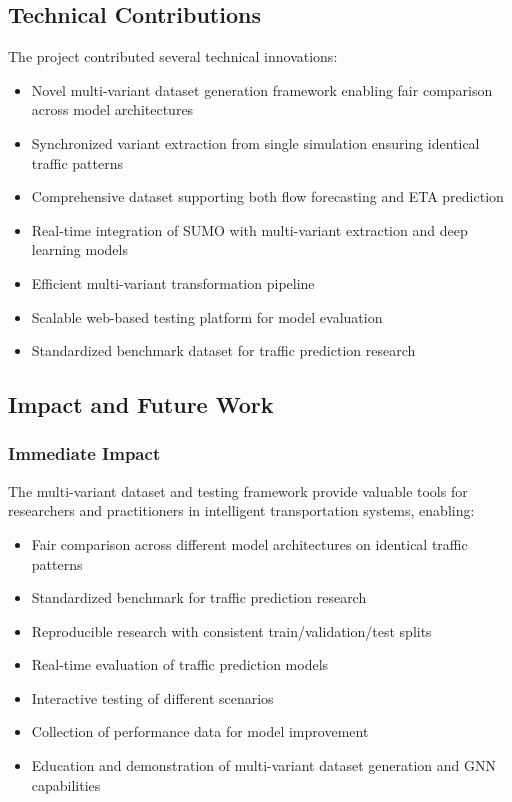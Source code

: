 \subsection{Technical Contributions}

The project contributed several technical innovations:
\begin{itemize}
    \item Novel multi-variant dataset generation framework enabling fair comparison across model architectures
    \item Synchronized variant extraction from single simulation ensuring identical traffic patterns
    \item Comprehensive dataset supporting both flow forecasting and ETA prediction
    \item Real-time integration of SUMO with multi-variant extraction and deep learning models
    \item Efficient multi-variant transformation pipeline
    \item Scalable web-based testing platform for model evaluation
    \item Standardized benchmark dataset for traffic prediction research
\end{itemize}

\subsection{Impact and Future Work}

\subsubsection{Immediate Impact}
The multi-variant dataset and testing framework provide valuable tools for researchers and practitioners in intelligent transportation systems, enabling:
\begin{itemize}
    \item Fair comparison across different model architectures on identical traffic patterns
    \item Standardized benchmark for traffic prediction research
    \item Reproducible research with consistent train/validation/test splits
    \item Real-time evaluation of traffic prediction models
    \item Interactive testing of different scenarios
    \item Collection of performance data for model improvement
    \item Education and demonstration of multi-variant dataset generation and GNN capabilities
\end{itemize}

